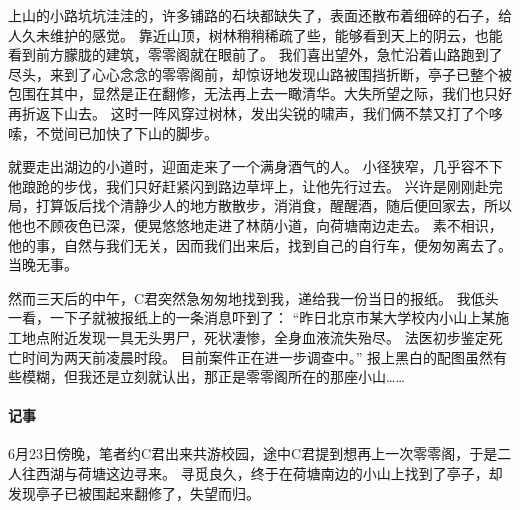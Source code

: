 上山的小路坑坑洼洼的，许多铺路的石块都缺失了，表面还散布着细碎的石子，给人久未维护的感觉。
靠近山顶，树林稍稍稀疏了些，能够看到天上的阴云，也能看到前方朦胧的建筑，零零阁就在眼前了。
我们喜出望外，急忙沿着山路跑到了尽头，来到了心心念念的零零阁前，却惊讶地发现山路被围挡折断，亭子已整个被包围在其中，显然是正在翻修，无法再上去一瞰清华。大失所望之际，我们也只好再折返下山去。
这时一阵风穿过树林，发出尖锐的啸声，我们俩不禁又打了个哆嗦，不觉间已加快了下山的脚步。

就要走出湖边的小道时，迎面走来了一个满身酒气的人。
小径狭窄，几乎容不下他踉跄的步伐，我们只好赶紧闪到路边草坪上，让他先行过去。
兴许是刚刚赴完局，打算饭后找个清静少人的地方散散步，消消食，醒醒酒，随后便回家去，所以他也不顾夜色已深，便晃悠悠地走进了林荫小道，向荷塘南边走去。
素不相识，他的事，自然与我们无关，因而我们出来后，找到自己的自行车，便匆匆离去了。
当晚无事。

然而三天后的中午，C君突然急匆匆地找到我，递给我一份当日的报纸。
我低头一看，一下子就被报纸上的一条消息吓到了：
“昨日北京市某大学校内小山上某施工地点附近发现一具无头男尸，死状凄惨，全身血液流失殆尽。
法医初步鉴定死亡时间为两天前凌晨时段。
目前案件正在进一步调查中。”
报上黑白的配图虽然有些模糊，但我还是立刻就认出，那正是零零阁所在的那座小山……

\vfill

\paragraph{记事}
6月23日傍晚，笔者约C君出来共游校园，途中C君提到想再上一次零零阁，于是二人往西湖与荷塘这边寻来。
寻觅良久，终于在荷塘南边的小山上找到了亭子，却发现亭子已被围起来翻修了，失望而归。
